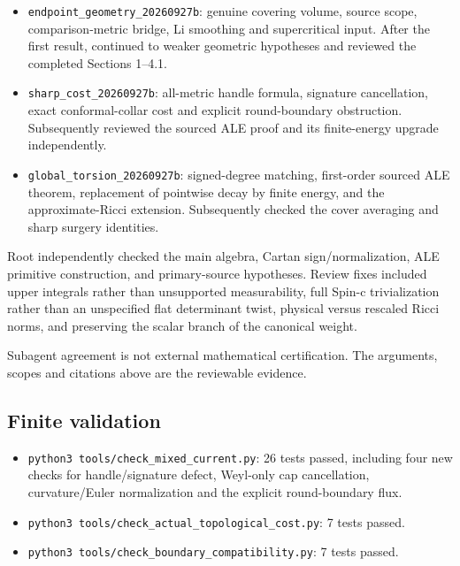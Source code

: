 \documentclass[
  10pt,
]{article}
\providecommand{\tightlist}{%
  \setlength{\itemsep}{0pt}\setlength{\parskip}{0pt}}
\begin{document}
\begin{itemize}
\tightlist
\item
  \texttt{endpoint\_geometry\_20260927b}: genuine covering volume,
  source scope, comparison-metric bridge, Li smoothing and supercritical
  input. After the first result, continued to weaker geometric
  hypotheses and reviewed the completed Sections 1--4.1.
\item
  \texttt{sharp\_cost\_20260927b}: all-metric handle formula, signature
  cancellation, exact conformal-collar cost and explicit round-boundary
  obstruction. Subsequently reviewed the sourced ALE proof and its
  finite-energy upgrade independently.
\item
  \texttt{global\_torsion\_20260927b}: signed-degree matching,
  first-order sourced ALE theorem, replacement of pointwise decay by
  finite energy, and the approximate-Ricci extension. Subsequently
  checked the cover averaging and sharp surgery identities.
\end{itemize}

Root independently checked the main algebra, Cartan sign/normalization,
ALE primitive construction, and primary-source hypotheses. Review fixes
included upper integrals rather than unsupported measurability, full
Spin-c trivialization rather than an unspecified flat determinant twist,
physical versus rescaled Ricci norms, and preserving the scalar branch
of the canonical weight.

Subagent agreement is not external mathematical certification. The
arguments, scopes and citations above are the reviewable evidence.

\hypertarget{finite-validation}{%
\subsection{Finite validation}\label{finite-validation}}

\begin{itemize}
\tightlist
\item
  \texttt{python3\ tools/check\_mixed\_current.py}: 26 tests passed,
  including four new checks for handle/signature defect, Weyl-only cap
  cancellation, curvature/Euler normalization and the explicit
  round-boundary flux.
\item
  \texttt{python3\ tools/check\_actual\_topological\_cost.py}: 7 tests
  passed.
\item
  \texttt{python3\ tools/check\_boundary\_compatibility.py}: 7 tests
  passed.
\end{itemize}
\end{document}
